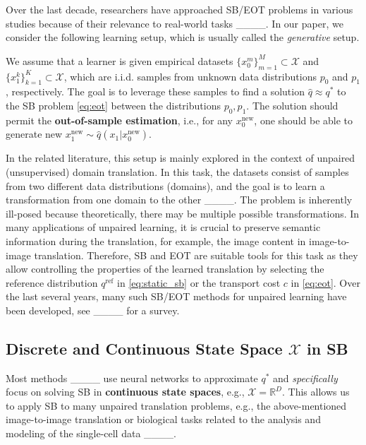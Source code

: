 Over the last decade, researchers have approached SB/EOT problems in various studies because of their relevance to real-world tasks ____. In our paper, we consider the following learning setup, which is usually called the \textit{generative} setup.

We assume that a learner is given empirical datasets $\{x^m_0\}_{m=1}^M \subset \mathcal{X}$ and $\{x^k_1\}_{k=1}^K \subset \mathcal{X}$, which are i.i.d. samples from unknown data distributions $p_0$ and $p_1$, respectively. The goal is to leverage these samples to find a solution $\widehat{q}\approx q^{*}$ to the SB problem \eqref{eq:eot} between the distributions $p_0, p_1$. The solution should permit the \textbf{out-of-sample estimation}, i.e., for any $x_{0}^{\text{new}}$, one should be able to generate new $x_{1}^{\text{new}}\sim \widehat{q}(x_1|x_{0}^{\text{new}})$.

In the related literature, this setup is mainly explored in the context of unpaired (unsupervised) domain translation. In this task, the datasets consist of samples from two different data distributions (domains), and the goal is to learn a transformation from one domain to the other ____. The problem is inherently ill-posed because theoretically, there may be multiple possible transformations. In many applications of unpaired learning, it is crucial to preserve semantic information during the translation, for example, the image content in image-to-image translation. Therefore, SB and EOT are suitable tools for this task as they allow controlling the properties of the learned translation by selecting the reference distribution $q^{\text{ref}}$ in \eqref{eq:static_sb} or the transport cost $c$ in \eqref{eq:eot}. Over the last several years, many such SB/EOT methods for unpaired learning have been developed, see ____ for a survey.

\subsection{Discrete and Continuous State Space $\mathcal{X}$ in SB}
\label{sec:bg-space}

Most methods ____ use neural networks to approximate $q^{*}$ and \textit{specifically} focus on solving SB in \textbf{continuous state spaces}, e.g., ${\mathcal{X}=\mathbb{R}^{D}}$. This allows us to apply SB to many unpaired translation problems, e.g., the above-mentioned image-to-image translation or biological tasks related to the analysis and modeling of the single-cell data ____.

